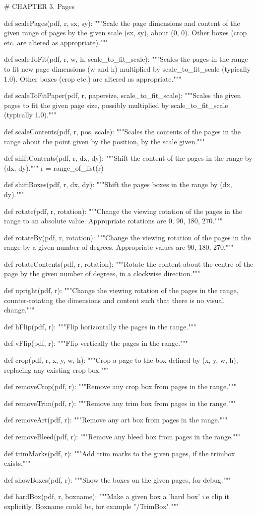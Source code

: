 # CHAPTER 3. Pages

def scalePages(pdf, r, sx, sy):
    """Scale the page dimensions and content of the given range of pages by
    the given scale (sx, sy), about (0, 0). Other boxes (crop etc. are altered
    as appropriate)."""

def scaleToFit(pdf, r, w, h, scale_to_fit_scale):
    """Scales the pages in the range to fit new page dimensions (w and h)
    multiplied by scale_to_fit_scale (typically 1.0).  Other boxes (crop etc.)
    are altered as appropriate."""

def scaleToFitPaper(pdf, r, papersize, scale_to_fit_scale):
    """Scales the given pages to fit the given page size, possibly multiplied
    by scale_to_fit_scale (typically 1.0)."""

def scaleContents(pdf, r, pos, scale):
    """Scales the contents of the pages in the range about the point given by
    the position, by the scale given."""

def shiftContents(pdf, r, dx, dy):
    """Shift the content of the pages in the range by (dx, dy)."""
    r = range_of_list(r)

def shiftBoxes(pdf, r, dx, dy):
    """Shift the pages boxes in the range by (dx, dy)."""

def rotate(pdf, r, rotation):
    """Change the viewing rotation of the pages in the range to an absolute
    value. Appropriate rotations are 0, 90, 180, 270."""

def rotateBy(pdf, r, rotation):
    """Change the viewing rotation of the pages in the range by a given number
    of degrees. Appropriate values are 90, 180, 270."""

def rotateContents(pdf, r, rotation):
    """Rotate the content about the centre of the page by the given number of
    degrees, in a clockwise direction."""

def upright(pdf, r):
    """Change the viewing rotation of the pages in the range, counter-rotating
    the dimensions and content such that there is no visual change."""

def hFlip(pdf, r):
    """Flip horizontally the pages in the range."""

def vFlip(pdf, r):
    """Flip vertically the pages in the range."""

def crop(pdf, r, x, y, w, h):
    """Crop a page to the box defined by (x, y, w, h), replacing any existing
    crop box."""

def removeCrop(pdf, r):
    """Remove any crop box from pages in the range."""

def removeTrim(pdf, r):
    """Remove any trim box from pages in the range."""

def removeArt(pdf, r):
    """Remove any art box from pages in the range."""

def removeBleed(pdf, r):
    """Remove any bleed box from pages in the range."""

def trimMarks(pdf, r):
    """Add trim marks to the given pages, if the trimbox exists."""

def showBoxes(pdf, r):
    """Show the boxes on the given pages, for debug."""

def hardBox(pdf, r, boxname):
    """Make a given box a 'hard box' i.e clip it explicitly. Boxname could be,
    for example "/TrimBox"."""
